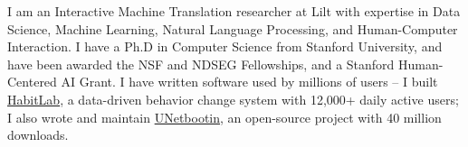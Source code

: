 \newcommand{\resumeURL}{https://www.gkovacs.com/resume.pdf}



I am an \textcolor{sectcol}{Interactive Machine Translation} researcher at Lilt with expertise in \textcolor{sectcol}{Data Science}, \textcolor{sectcol}{Machine Learning}, \textcolor{sectcol}{Natural Language Processing}, and \textcolor{sectcol}{Human-Computer Interaction}. I have a Ph.D in Computer Science from Stanford University, and have been awarded the NSF and NDSEG Fellowships, and a Stanford Human-Centered AI Grant. I have written software used by millions of users -- I built \hypersetup{urlcolor=black}\href{https://habitlab.github.io}{HabitLab}\hypersetup{urlcolor=linkcol}, a data-driven behavior change system with \textcolor{sectcol}{12,000+ daily active users}; I also wrote and maintain \hypersetup{urlcolor=black}\href{https://unetbootin.github.io}{UNetbootin}\hypersetup{urlcolor=linkcol}, an open-source project with \textcolor{sectcol}{40 million downloads}.\\



